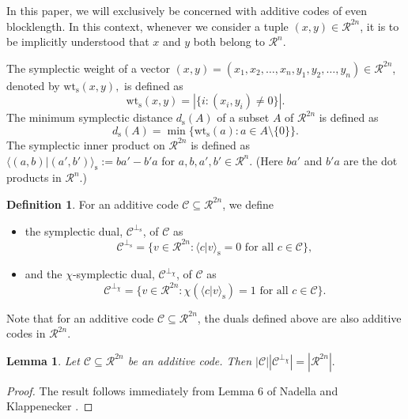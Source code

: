 \documentclass{article}
\newtheorem{lem}{Lemma}[section]
\theoremstyle{remark}
\theoremstyle{definition}
\newtheorem{defin}{Definition}[section]
\numberwithin{equation}{section}
\begin{document}
In this paper, we will exclusively be concerned with additive codes of even blocklength. In this context, whenever we consider a tuple $(x,y) \in \mathcal{R}^{2n}$, it is to be implicitly understood that $x$ and $y$ both belong to $\mathcal{R}^n$.

 The symplectic weight of a vector $(x,y)=(x_1,x_2,\ldots,x_n,y_1,y_2,\ldots,y_n) \in \mathcal{R}^{2n}$, denoted by $\text{wt}_{\text{s}}(x,y),$ is defined as $$\text{wt}_{\text{s}}(x,y)=|\{ i : (x_i,y_i) \neq 0\}|.$$ The minimum symplectic distance $d_{\mathrm{s}}(A)$ of a subset $A$ of $\mathcal{R}^{2n}$ is defined as  
 $$d_{\mathrm{s}}(A)=\min\{\text{wt}_{\text{s}}(a) :a \in A\setminus \{0\}\}.$$
The symplectic inner product on $\mathcal{R}^{2n}$ is defined as $\langle (a,b) | (a',b')\rangle_{\text{s}} := ba'-b'a$  for $a,b,a',b' \in \mathcal{R}^n.$ (Here $ba'$ and $b'a$ are the dot products in $\mathcal{R}^n.$)

\begin{defin} For an additive code $\mathcal{C} \subseteq \mathcal{R}^{2n}$, we define
\begin{itemize}
\item the symplectic dual, $\mathcal{C}^{\perp_\text{s}}$, of $\mathcal{C}$ as
$$\mathcal{C}^{\perp_{\mathrm{s}}}=\{v \in \mathcal{R}^{2n} :  \langle c | v\rangle_{\text{s}} = 0 \text{~for all~} c \in \mathcal{C}\},$$
\item and the $\chi$-symplectic dual, $\mathcal{C}^{\perp_\chi}$, of $\mathcal{C}$ as $$\mathcal{C}^{\perp_\chi}=\{v \in \mathcal{R}^{2n} : \chi(\langle c | v\rangle_{\text{s}}) = 1 \text{~for all~} c \in \mathcal{C}\}.$$
\end{itemize}
\end{defin}

Note that for an additive code $\mathcal{C} \subseteq \mathcal{R}^{2n}$, the duals defined above are also additive codes in $\mathcal{R}^{2n}.$

\begin{lem}\label{card}  Let $\mathcal{C} \subseteq \mathcal{R}^{2n}$ be an additive code. Then
 $|\mathcal{C}||\mathcal{C}^{\perp_\chi}|=|\mathcal{R}^{2n}|.$
 \end{lem} 
  \begin{proof} The result follows immediately from Lemma 6 of Nadella and Klappenecker  \cite{nadella}.  \end{proof}
\end{document}
